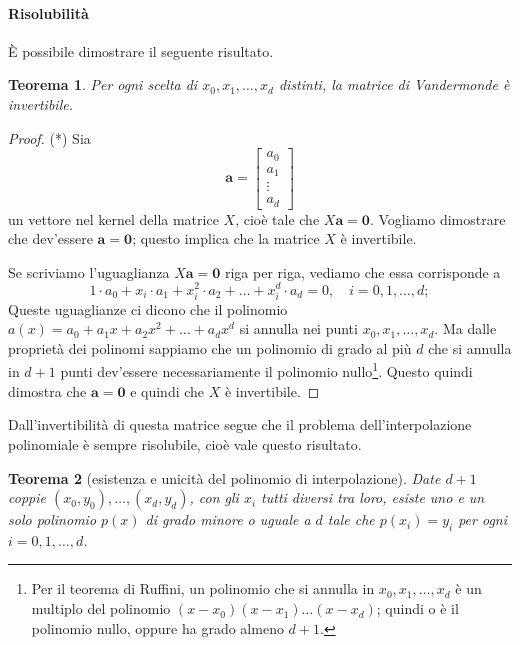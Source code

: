 \documentclass[a4paper]{report}
\newtheorem{theorem}{Teorema}[chapter]
\theoremstyle{definition}
\theoremstyle{remark}
\begin{document}
\paragraph{Risolubilità} È possibile dimostrare il seguente risultato.
\begin{theorem}
Per ogni scelta di $x_0,x_1,\dots, x_d$ \emph{distinti}, la matrice di Vandermonde è invertibile.
\end{theorem}
\begin{proof} (*)
Sia
\[
\mathbf{a} = \begin{bmatrix}
    a_0\\
    a_1\\
    \vdots\\
    a_d
\end{bmatrix}
\]
un vettore nel kernel della matrice $X$, cioè tale che $X\mathbf{a} = \mathbf{0}$. Vogliamo dimostrare che dev'essere $\mathbf{a} = \mathbf{0}$; questo implica che la matrice $X$ è invertibile.

Se scriviamo l'uguaglianza $X\mathbf{a} = \mathbf{0}$ riga per riga, vediamo che essa corrisponde a
\[
1\cdot a_0 + x_i \cdot a_1 + x_i^2 \cdot a_2 + \dots + x_i^d \cdot a_d = 0, \quad i=0,1,\dots,d;
\]
Queste uguaglianze ci dicono che il polinomio $a(x) = a_0 + a_1 x + a_2 x^2 + \dots + a_d x^d$ si annulla nei punti $x_0, x_1, \dots, x_d$. Ma dalle proprietà dei polinomi sappiamo che un polinomio di grado al più $d$ che si annulla in $d+1$ punti dev'essere necessariamente il polinomio nullo\footnote{Per il teorema di Ruffini, un polinomio che si annulla in $x_0,x_1,\dots,x_d$ è un multiplo del polinomio $(x-x_0)(x-x_1)\dots (x-x_d)$; quindi o è il polinomio nullo, oppure ha grado almeno $d+1$.}. Questo quindi dimostra che $\mathbf{a}=\mathbf{0}$ e quindi che $X$ è invertibile.
\end{proof}
Dall'invertibilità di questa matrice segue che il problema dell'interpolazione polinomiale è sempre risolubile, cioè vale questo risultato.
\begin{theorem}[esistenza e unicità del polinomio di interpolazione]
Date $d+1$ coppie $(x_0,y_0),\dots,(x_d,y_d)$, con gli $x_i$ tutti diversi tra loro, esiste uno e un solo polinomio $p(x)$ di grado minore o uguale a $d$ tale che $p(x_i)=y_i$ per ogni $i=0,1,\dots,d$.
\end{theorem}
\end{document}
